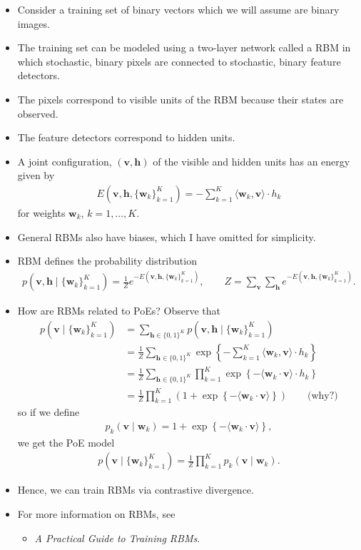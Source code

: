 \documentclass[10pt]{article}
\begin{document}
\begin{itemize}
\item Consider a training set of binary vectors which we will assume are binary images.
\item The training set can be modeled using a two-layer network called a RBM in which stochastic, binary pixels are connected to stochastic, binary feature detectors.
\item The pixels correspond to visible units of the RBM because their states are observed.
\item The feature detectors correspond to hidden units.
\item A joint configuration, $(\mathbf{v},\mathbf{h})$ of the visible and hidden units has an energy given by
\begin{align*}
E(\mathbf{v},\mathbf{h}, \{\mathbf{w}_k\}_{k = 1}^K) = -\sum_{k = 1}^K \langle \mathbf{w}_k, \mathbf{v} \rangle \cdot h_k
\end{align*}
for weights $\mathbf{w}_k$, $k = 1, \ldots, K$.
\item General RBMs also have biases, which I have omitted for simplicity.
\item RBM defines the probability distribution
\begin{align*}
p(\mathbf{v},\mathbf{h} \mid \{\mathbf{w}_k\}_{k = 1}^K) = \frac{1}{Z} e^{-E(\mathbf{v},\mathbf{h}, \{\mathbf{w}_k\}_{k = 1}^K)}, \qquad Z = \sum_\mathbf{v} \sum_\mathbf{h} e^{-E(\mathbf{v},\mathbf{h},\{\mathbf{w}_k\}_{k = 1}^K)}.
\end{align*}
\item How are RBMs related to PoEs? Observe that
\begin{align*}
p(\mathbf{v} \mid \{\mathbf{w}_k\}_{k = 1}^K) &= \sum_{\mathbf{h} \in \{0, 1\}^K} p(\mathbf{v}, \mathbf{h} \mid \{\mathbf{w}_k\}_{k = 1}^K) \\
&= \frac{1}{Z} \sum_{\mathbf{h} \in \{0, 1\}^K} \exp\left\{ -\sum_{k = 1}^K \langle \mathbf{w}_k, \mathbf{v} \rangle \cdot h_k \right\} \\
&= \frac{1}{Z} \sum_{\mathbf{h} \in \{0, 1\}^K} \prod_{k = 1}^K \exp\left\{ - \langle \mathbf{w}_k \cdot \mathbf{v} \rangle \cdot h_k \right\} \\
&= \frac{1}{Z} \prod_{k = 1}^K (1 + \exp\left\{ - \langle \mathbf{w}_k \cdot \mathbf{v} \rangle \right\}) \qquad \text{(why?)}
\end{align*}
so if we define
\begin{align*}
p_k(\mathbf{v} \mid \mathbf{w}_k) = 1 + \exp\left\{ - \langle \mathbf{w}_k \cdot \mathbf{v} \rangle \right\},
\end{align*}
we get the PoE model
\begin{align*}
p(\mathbf{v} \mid \{\mathbf{w}_k\}_{k = 1}^K) = \frac{1}{Z} \prod_{k = 1}^K p_k(\mathbf{v} \mid \mathbf{w}_k).
\end{align*}
\item Hence, we can train RBMs via contrastive divergence.
\item For more information on RBMs, see
\begin{itemize}
\item \textit{A Practical Guide to Training RBMs}.
\end{itemize}
\end{itemize}
\end{document}
